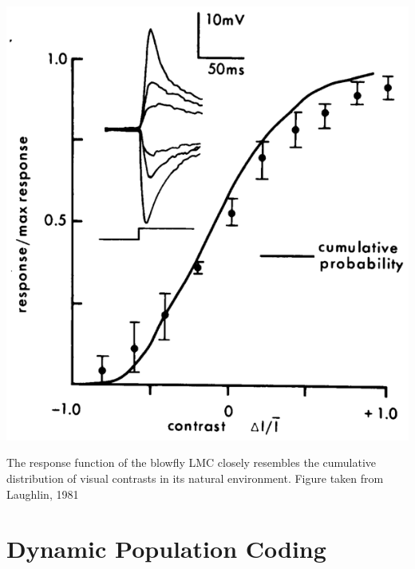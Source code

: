 \begin{marginfigure}
\includegraphics[width=\columnwidth]{figures/laughlin_81.eps}
\label{fig:laughlin}
\caption{The response function of the blowfly LMC closely resembles the cumulative distribution of visual contrasts in its natural environment. Figure taken from Laughlin, 1981}
\end{marginfigure}

\section{Dynamic Population Coding}


